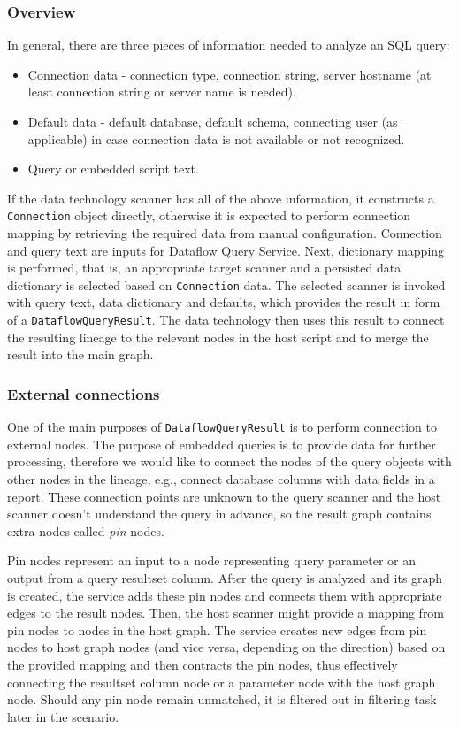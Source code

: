 \subsubsection{Overview}
In general, there are three pieces of information needed to analyze an SQL query:
\begin{itemize}
    \item Connection data - connection type, connection string, server hostname (at least connection string or server name is needed).
    \item Default data - default database, default schema, connecting user (as applicable) in case connection data is not available or not recognized.
    \item Query or embedded script text.
\end{itemize}
If the data technology scanner has all of the above information, it constructs a \texttt{Connection} object directly, otherwise it is expected to perform connection mapping by retrieving the required data from manual configuration. Connection and query text are inputs for Dataflow Query Service. Next, dictionary mapping is performed, that is, an appropriate target scanner and a persisted data dictionary is selected based on \texttt{Connection} data. The selected scanner is invoked with query text, data dictionary and defaults, which provides the result in form of a \texttt{DataflowQueryResult}. The data technology then uses this result to connect the resulting lineage to the relevant nodes in the host script and to merge the result into the main graph.

\subsubsection{External connections}
One of the main purposes of \texttt{DataflowQueryResult} is to perform connection to external nodes. The purpose of embedded queries is to provide data for further processing, therefore we would like to connect the nodes of the query objects with other nodes in the lineage, e.g., connect database columns with data fields in a report. These connection points are unknown to the query scanner and the host scanner doesn't understand the query in advance, so the result graph contains extra nodes called \textit{pin} nodes.
\par
Pin nodes represent an input to a node representing query parameter or an output from a query resultset column. After the query is analyzed and its graph is created, the service adds these pin nodes and connects them with appropriate edges to the result nodes. Then, the host scanner might provide a mapping from pin nodes to nodes in the host graph. The service creates new edges from pin nodes to host graph nodes (and vice versa, depending on the direction) based on the provided mapping and then contracts the pin nodes, thus effectively connecting the resultset column node or a parameter node with the host graph node. Should any pin node remain unmatched, it is filtered out in filtering task later in the scenario.

